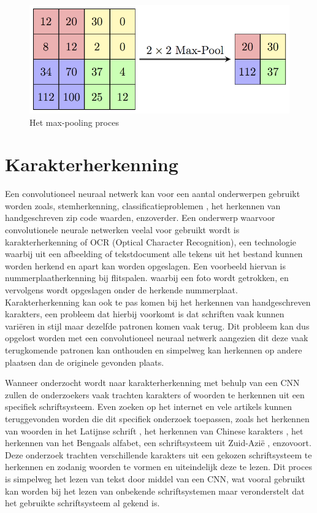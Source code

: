 \begin{figure}
	
	
	\includegraphics[width=\linewidth]{img/pooling.png}
	\caption{Het max-pooling proces}
	\label{tab:pooling}
\end{figure}

\section{Karakterherkenning}

Een convolutioneel neuraal netwerk kan voor een aantal onderwerpen gebruikt worden zoals, stemherkenning, classificatieproblemen \autocite{Yann1997}, het herkennen van handgeschreven zip code waarden\autocite{J.S.}, enzoverder.
Een onderwerp waarvoor convolutionele neurale netwerken veelal voor gebruikt wordt is karakterherkenning of OCR (Optical Character Recognition), een technologie waarbij uit een afbeelding of tekstdocument alle tekens uit het bestand kunnen worden herkend en apart kan worden opgeslagen.
Een voorbeeld hiervan is nummerplaatherkenning bij flitspalen. waarbij een foto wordt getrokken, en vervolgens wordt opgeslagen onder de herkende nummerplaat.
Karakterherkenning kan ook te pas komen bij het herkennen van handgeschreven karakters, een probleem dat hierbij voorkomt is dat schriften vaak kunnen variëren in stijl maar dezelfde patronen komen vaak terug.
Dit probleem kan dus opgelost worden met een convolutioneel neuraal netwerk aangezien dit deze vaak terugkomende patronen kan onthouden en simpelweg kan herkennen op andere plaatsen dan de originele gevonden plaats.

Wanneer onderzocht wordt naar karakterherkenning met behulp van een CNN zullen de onderzoekers vaak trachten karakters of woorden te herkennen uit een specifiek schriftsysteem. \autocite{Yoshua}\autocite{Yann}
Even zoeken op het internet en vele artikels kunnen teruggevonden worden die dit specifiek onderzoek toepassen, zoals het herkennen van woorden in het Latijnse schrift \autocite{Aiquan2012}, het herkennen van Chinese karakters \autocite{Weixin}, het herkennen van het Bengaals alfabet, een schriftsysteem uit Zuid-Azië \autocite{Mahbubar2015}, enzovoort.
Deze onderzoek trachten verschillende karakters uit een gekozen schriftsysteem te herkennen en zodanig woorden te vormen en uiteindelijk deze te lezen. Dit proces is simpelweg het lezen van tekst door middel van een CNN, wat vooral gebruikt kan worden bij het lezen van onbekende schriftsystemen maar veronderstelt dat het gebruikte schriftsysteem al gekend is.

